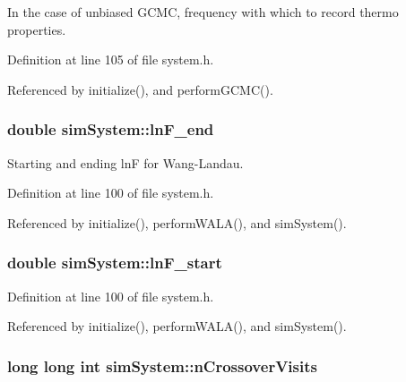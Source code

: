 In the case of unbiased G\-C\-M\-C, frequency with which to record thermo properties. 



Definition at line 105 of file system.\-h.



Referenced by initialize(), and perform\-G\-C\-M\-C().

\hypertarget{classsim_system_a3fb5d01fd3abf49f577c050968fba9d1}{
\subsubsection[{ln\-F\-\_\-end}]{\setlength{\rightskip}{0pt plus 5cm}double sim\-System\-::ln\-F\-\_\-end}}\label{classsim_system_a3fb5d01fd3abf49f577c050968fba9d1}


Starting and ending ln\-F for Wang-\/\-Landau. 



Definition at line 100 of file system.\-h.



Referenced by initialize(), perform\-W\-A\-L\-A(), and sim\-System().

\hypertarget{classsim_system_a794334e163fbeb4b4f61bcea676679ce}{
\subsubsection[{ln\-F\-\_\-start}]{\setlength{\rightskip}{0pt plus 5cm}double sim\-System\-::ln\-F\-\_\-start}}\label{classsim_system_a794334e163fbeb4b4f61bcea676679ce}


Definition at line 100 of file system.\-h.



Referenced by initialize(), perform\-W\-A\-L\-A(), and sim\-System().

\hypertarget{classsim_system_aa748f651ddd9a2bf6d88bfcab9153905}{
\subsubsection[{n\-Crossover\-Visits}]{\setlength{\rightskip}{0pt plus 5cm}long long int sim\-System\-::n\-Crossover\-Visits}}\label{classsim_system_aa748f651ddd9a2bf6d88bfcab9153905}



